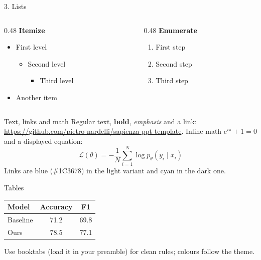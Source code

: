 \documentclass[t,aspectratio=169]{beamer}
\newcommand{\code}[1]{{\ttfamily\small #1}}
\begin{document}
\begin{frame}{3. Lists}
  \begin{columns}[T]
    \begin{column}{0.48\textwidth}
      \textbf{Itemize}
      \begin{itemize}
        \item First level
          \begin{itemize}
            \item Second level
              \begin{itemize}\item Third level\end{itemize}
          \end{itemize}
        \item Another item
      \end{itemize}
    \end{column}
    \begin{column}{0.48\textwidth}
      \textbf{Enumerate}
      \begin{enumerate}
        \item First step
        \item Second step
        \item Third step
      \end{enumerate}
    \end{column}
  \end{columns}
\end{frame}

\begin{frame}{Text, links and math}
  Regular text, \textbf{bold}, \emph{emphasis} and a link: \url{https://github.com/pietro-nardelli/sapienza-ppt-template}.
  \vspace{0.8em}
  Inline math $e^{i\pi}+1=0$ and a displayed equation:
  \[
    \mathcal{L}(\theta)=-\frac{1}{N}\sum_{i=1}^{N}\log p_\theta(y_i\mid x_i)
  \]
  Links are blue (\code{\#1C3678}) in the light variant and cyan in the dark one.
\end{frame}

\begin{frame}{Tables}
  \centering
  \begin{tabular}{lcc}
    \toprule
    \textbf{Model} & \textbf{Accuracy} & \textbf{F1} \\
    \midrule
    Baseline & 71.2 & 69.8 \\
    Ours     & 78.5 & 77.1 \\
    \bottomrule
  \end{tabular}
  \vspace{1em}

  Use \code{booktabs} (load it in your preamble) for clean rules; colours follow the theme.
\end{frame}
\end{document}

